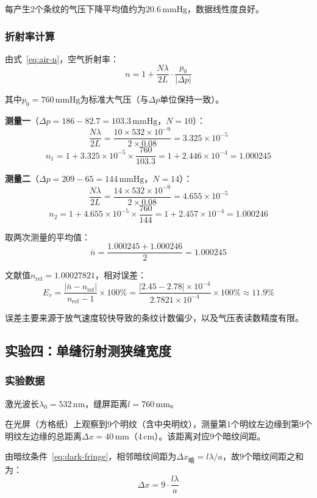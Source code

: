 \documentclass[UTF8]{article}
\begin{document}
每产生2个条纹的气压下降平均值约为$20.6\,\mathrm{mmHg}$，数据线性度良好。

\subsubsection{折射率计算}

由式~\eqref{eq:air-n}，空气折射率：
\[
n = 1 + \frac{N\lambda}{2L} \cdot \frac{p_0}{|\Delta p|}
\]

其中$p_0 = 760\,\mathrm{mmHg}$为标准大气压（与$\Delta p$单位保持一致）。

\textbf{测量一}（$\Delta p = 186 - 82.7 = 103.3\,\mathrm{mmHg}$，$N = 10$）：
\[
\frac{N\lambda}{2L} = \frac{10 \times 532 \times 10^{-9}}{2 \times 0.08} = 3.325 \times 10^{-5}
\]
\[
n_1 = 1 + 3.325 \times 10^{-5} \times \frac{760}{103.3} = 1 + 2.446 \times 10^{-4} = 1.000245
\]

\textbf{测量二}（$\Delta p = 209 - 65 = 144\,\mathrm{mmHg}$，$N = 14$）：
\[
\frac{N\lambda}{2L} = \frac{14 \times 532 \times 10^{-9}}{2 \times 0.08} = 4.655 \times 10^{-5}
\]
\[
n_2 = 1 + 4.655 \times 10^{-5} \times \frac{760}{144} = 1 + 2.457 \times 10^{-4} = 1.000246
\]

取两次测量的平均值：
\[
\bar{n} = \frac{1.000245 + 1.000246}{2} = 1.000245
\]

文献值$n_{\text{ref}} = 1.00027821$，相对误差：
\[
E_r = \frac{|\bar{n} - n_{\text{ref}}|}{n_{\text{ref}} - 1} \times 100\% = \frac{|2.45 - 2.78| \times 10^{-4}}{2.7821 \times 10^{-4}} \times 100\% \approx 11.9\%
\]

误差主要来源于放气速度较快导致的条纹计数偏少，以及气压表读数精度有限。

\subsection{实验四：单缝衍射测狭缝宽度}

\subsubsection{实验数据}

激光波长$\lambda_0 = 532\,\mathrm{nm}$，缝屏距离$l = 760\,\mathrm{mm}$。

在光屏（方格纸）上观察到9个明纹（含中央明纹），测量第1个明纹左边缘到第9个明纹左边缘的总距离$\Delta x = 40\,\mathrm{mm}$（4\,cm）。该距离对应9个暗纹间距。

由暗纹条件~\eqref{eq:dark-fringe}，相邻暗纹间距为$\Delta x_{\text{暗}} = l\lambda/a$，故9个暗纹间距之和为：
\[
\Delta x = 9 \cdot \frac{l\lambda}{a}
\]
\end{document}

